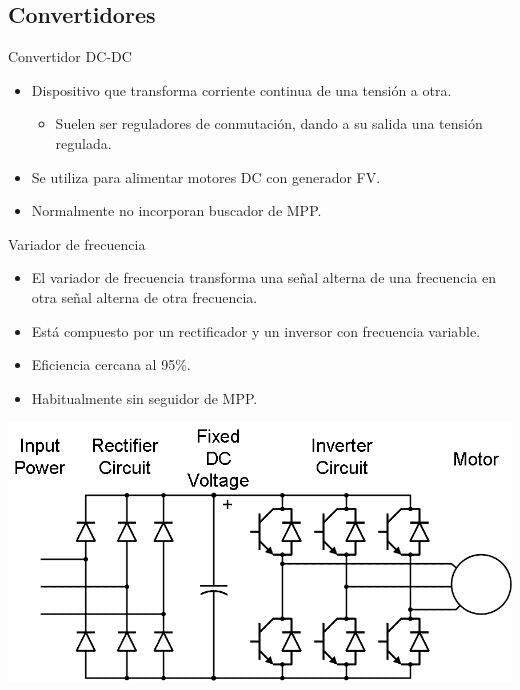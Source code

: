 \documentclass[xcolor={usenames,svgnames,dvipsnames}]{beamer}
\begin{document}
\subsection{Convertidores}
\label{sec:org2811427}
\begin{frame}[label={sec:org837c42b}]{Convertidor DC-DC}
\begin{itemize}
\item Dispositivo que \alert{transforma corriente continua de una tensión a otra}.

\begin{itemize}
\item Suelen ser reguladores de conmutación, dando a su salida una tensión regulada.
\end{itemize}

\item Se utiliza para alimentar \alert{motores DC con generador FV}.

\item Normalmente no incorporan buscador de MPP.
\end{itemize}
\end{frame}

\begin{frame}[label={sec:orgdc8af02}]{Variador de frecuencia}
\begin{itemize}
\item El variador de frecuencia \alert{transforma una señal alterna de una frecuencia en otra señal alterna de otra frecuencia}.

\item Está compuesto por un rectificador y un inversor con frecuencia variable.

\item Eficiencia cercana al 95\%.

\item Habitualmente sin seguidor de MPP.
\end{itemize}

\begin{center}
\includegraphics[width=.9\linewidth]{../figs/VariadorFrecuencia_esquema.png}
\end{center}
\end{frame}
\end{document}
